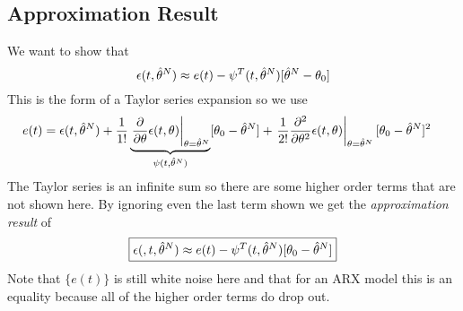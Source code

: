 \subsection{Approximation Result}
We want to show that
$$\epsilon(t,\hat{\theta}^N) \approx e(t) - \psi^T(t,\hat{\theta}^N)[\hat{\theta}^N-\theta_0]$$
This is the form of a Taylor series expansion so we use
\begin{align*}
e(t) &= \epsilon(t,\hat{\theta}^N) + \frac{1}{1!}\underbrace{\left.\frac{\partial}{\partial\theta}\epsilon(t,\theta)\right|_{\theta=\hat{\theta}^N}}_{\psi(t,\hat{\theta}^N)}[\theta_0-\hat{\theta}^N] + \left.\frac{1}{2!}\frac{\partial^2}{\partial\theta^2}\epsilon(t,\theta)\right|_{\theta=\hat{\theta}^N}[\theta_0-\hat{\theta}^N]^2
\end{align*}
The Taylor series is an infinite sum so there are some higher order terms that are not shown here. By ignoring even the last term shown we get the \textit{approximation result} of
\begin{align}
\label{eq:14approximation}
\boxed{\epsilon(,t,\hat{\theta}^N) \approx e(t) - \psi^T(t,\hat{\theta}^N)[\theta_0-\hat{\theta}^N]}
\end{align}
Note that $\{e(t)\}$ is still white noise here and that for an ARX model this is an equality because all of the higher order terms do drop out.

